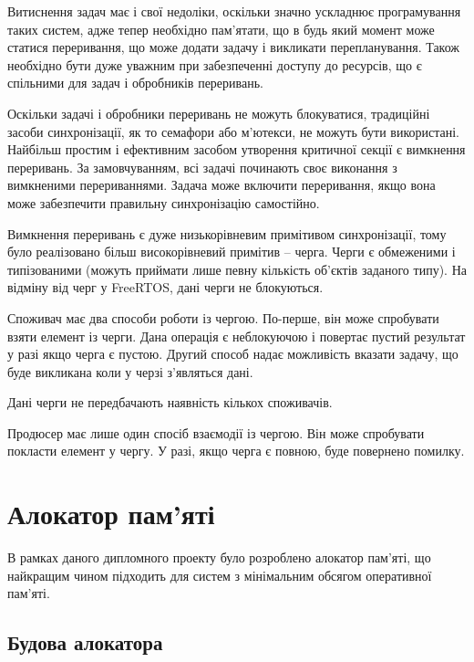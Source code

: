 \documentclass[oneside,14pt,a4paper,final]{myextreport}
\begin{document}
Витиснення задач має і свої недоліки, оскільки значно ускладнює програмування таких систем, адже тепер необхідно пам'ятати, що в будь який момент може статися переривання, що може додати задачу і викликати перепланування. Також необхідно бути дуже уважним при забезпеченні доступу до ресурсів, що є спільними для задач і обробників переривань.

Оскільки задачі і обробники переривань не можуть блокуватися, традиційні засоби синхронізації, як то семафори або м'ютекси, не можуть бути використані. Найбільш простим і ефективним засобом утворення критичної секції є вимкнення переривань. За замовчуванням, всі задачі починають своє виконання з вимкненими перериваннями. Задача може включити переривання, якщо вона може забезпечити правильну синхронізацію самостійно.

Вимкнення переривань є дуже низькорівневим примітивом синхронізації, тому було реалізовано більш високорівневий примітив -- черга. Черги є обмеженими і типізованими (можуть приймати лише певну кількість об'єктів заданого типу). На відміну від черг у FreeRTOS, дані черги не блокуються.

Споживач має два способи роботи із чергою. По-перше, він може спробувати взяти елемент із черги. Дана операція є неблокуючою і повертає пустий результат у разі якщо черга є пустою. Другий способ надає можливість вказати задачу, що буде викликана коли у черзі з'являться дані.

Дані черги не передбачають наявність кількох споживачів.

Продюсер має лише один спосіб взаємодії із чергою. Він може спробувати покласти елемент у чергу. У разі, якщо черга є повною, буде повернено помилку.

\section{Алокатор пам'яті}

В рамках даного дипломного проекту було розроблено алокатор пам'яті, що найкращим чином підходить для систем з мінімальним обсягом оперативної пам'яті.

\subsection{Будова алокатора}
\end{document}
